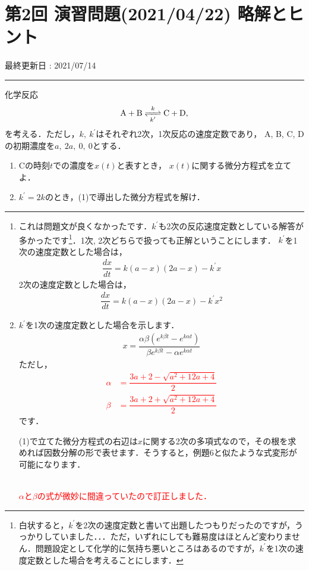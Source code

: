 \documentclass[11pt,a4]{jsarticle}
\numberwithin{equation}{section}
\begin{document}
\section*{第2回 演習問題(2021/04/22) 略解とヒント}
%
\begin{flushright}
 最終更新日 : 2021/07/14 
\end{flushright}
\hrule
%
\vspace*{.2cm}
\enshu
化学反応
\begin{align*}
  \ce{A + B <=>[k][k^{\prime}] C + D}, 
\end{align*}
を考える．ただし，$k,~k^{\prime}$はそれぞれ2次，1次反応の速度定数であり，
A, B, C, Dの初期濃度を$a,~2a,~0,~0$とする．
\begin{enumerate}[(1)]
  \item Cの時刻$t$での濃度を$x(t)$と表すとき，
	$x(t)$に関する微分方程式を立てよ．
  \item $k^\prime = 2k$のとき，(1)で導出した微分方程式を解け． 
\end{enumerate}
%
\hrule
\vspace*{.2cm}
%
\begin{enumerate}[(1)]
\item これは問題文が良くなかったです．$k^{\prime}$も2次の反応速度定数としている解答が多かったです\footnote{白状すると，$k^{\prime}$を2次の速度定数と書いて出題したつもりだったのですが，うっかりしていました．．．ただ，いずれにしても難易度はほとんど変わりません．問題設定として化学的に気持ち悪いところはあるのですが，$k^{\prime}$を1次の速度定数とした場合を考えることにします．}．1次, 2次どちらで扱っても正解ということにします．
$k^{\prime}$を1次の速度定数とした場合は，
\begin{align*}
 \dfrac{dx}{dt} = k(a-x)(2a-x) - k^{\prime}x 
\end{align*}
2次の速度定数とした場合は，
\begin{align*}
 \dfrac{dx}{dt} = k(a-x)(2a-x) - k^{\prime}x^2
\end{align*}
%
\item $k^{\prime}$を1次の速度定数とした場合を示します．
\begin{align*}
x=\dfrac{\alpha\beta\left(e^{k\beta t}-e^{k\alpha t}\right)}{\beta e^{k\beta t}-\alpha e^{k\alpha t}}
\end{align*}
ただし，
\textcolor{red}{
\begin{align*}
 \alpha & = \dfrac{3a+2-\sqrt{a^{2}+12a+4}}{2} \\
 \beta  & = \dfrac{3a+2+\sqrt{a^{2}+12a+4}}{2}
\end{align*}
}
です．

(1)で立てた微分方程式の右辺は$x$に関する2次の多項式なので，その根を求めれば因数分解の形で表せます．そうすると，例題6と似たような式変形が可能になります．

\vspace*{.2cm}
\noindent
\textcolor{red}{
\\[.2cm]
$\alpha$と$\beta$の式が微妙に間違っていたので訂正しました．
}

%
\end{enumerate}
\end{document}
